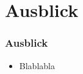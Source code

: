 \section{Ausblick}

\begin{frame}
	\frametitle{Ausblick}
	\begin{itemize}
		\item Blablabla
	\end{itemize}
\end{frame}
